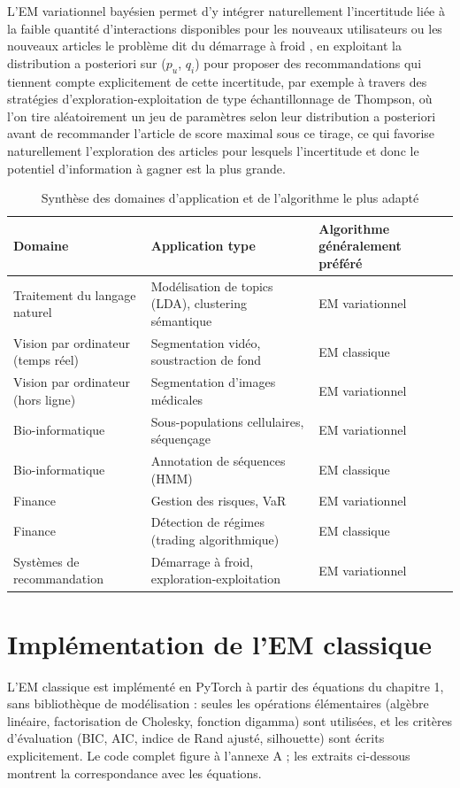 L'EM variationnel bayésien permet d'y intégrer naturellement l'incertitude liée à la faible quantité d'interactions disponibles pour les nouveaux utilisateurs ou les nouveaux articles  le problème dit du démarrage à froid , en exploitant la distribution a posteriori sur ($p_{u}$, $q_{i}$) pour proposer des recommandations qui tiennent compte explicitement de cette incertitude, par exemple à travers des stratégies d'exploration-exploitation de type échantillonnage de Thompson, où l'on tire aléatoirement un jeu de paramètres selon leur distribution a posteriori avant de recommander l'article de score maximal sous ce tirage, ce qui favorise naturellement l'exploration des articles pour lesquels l'incertitude  et donc le potentiel d'information à gagner  est la plus grande.

\begin{table}[H]
\centering
\small
\setlength{\tabcolsep}{0.14cm}
\begin{tabular}{|p{4.84cm}|p{4.84cm}|p{4.84cm}|}
\hline
\textbf{Domaine} & \textbf{Application type} & \textbf{Algorithme généralement préféré} \\
\hline
Traitement du langage naturel & Modélisation de topics (LDA), clustering sémantique & EM variationnel \\
\hline
Vision par ordinateur (temps réel) & Segmentation vidéo, soustraction de fond & EM classique \\
\hline
Vision par ordinateur (hors ligne) & Segmentation d'images médicales & EM variationnel \\
\hline
Bio-informatique & Sous-populations cellulaires, séquençage & EM variationnel \\
\hline
Bio-informatique & Annotation de séquences (HMM) & EM classique \\
\hline
Finance & Gestion des risques, VaR & EM variationnel \\
\hline
Finance & Détection de régimes (trading algorithmique) & EM classique \\
\hline
Systèmes de recommandation & Démarrage à froid, exploration-exploitation & EM variationnel \\
\hline
\end{tabular}
\caption{Synthèse des domaines d'application et de l'algorithme le plus adapté}
\label{tab:3_1}
\end{table}
\section{Implémentation de l'EM classique}
L'EM classique est implémenté en PyTorch à partir des équations du chapitre 1, sans bibliothèque de modélisation : seules les opérations élémentaires (algèbre linéaire, factorisation de Cholesky, fonction digamma) sont utilisées, et les critères d'évaluation (BIC, AIC, indice de Rand ajusté, silhouette) sont écrits explicitement. Le code complet figure à l'annexe A ; les extraits ci-dessous montrent la correspondance avec les équations.


